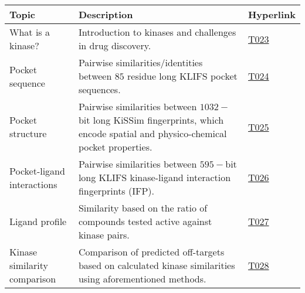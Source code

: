 \begin{tabular}{p{}p{}p{}}
    \hline
    \textbf{Topic} & \textbf{Description} & \textbf{Hyperlink} \\
    \hline
    \hline
    What is a kinase? & Introduction to kinases and challenges in drug discovery. & \href{https://projects.volkamerlab.org/teachopencadd/talktorials/T023\_what\_is\_a\_kinase.html}{T023} \\
    Pocket sequence & Pairwise similarities/identities between $85$ residue long KLIFS pocket sequences. & \href{https://projects.volkamerlab.org/teachopencadd/talktorials/T024\_kinase\_similarity\_sequence.html}{T024} \\
    Pocket structure & Pairwise similarities between $1032-$bit long KiSSim fingerprints, which encode spatial and physico-chemical pocket properties. & \href{https://projects.volkamerlab.org/teachopencadd/talktorials/T025\_kinase\_similarity\_kissim.html}{T025} \\
    Pocket-ligand interactions & Pairwise similarities between $595-$bit long KLIFS kinase-ligand interaction fingerprints (IFP). & \href{https://projects.volkamerlab.org/teachopencadd/talktorials/T026\_kinase\_similarity\_ifp.html}{T026} \\
    Ligand profile & Similarity based on the ratio of compounds tested active against kinase pairs.& \href{https://projects.volkamerlab.org/teachopencadd/talktorials/T027\_kinase\_similarity\_ligand\_profile.html}{T027} \\
    Kinase similarity comparison & Comparison of predicted off-targets based on calculated kinase similarities using aforementioned methods. & \href{https://projects.volkamerlab.org/teachopencadd/talktorials/T028\_kinase\_similarity\_compare\_perspectives.html}{T028} \\
    \hline
\end{tabular}